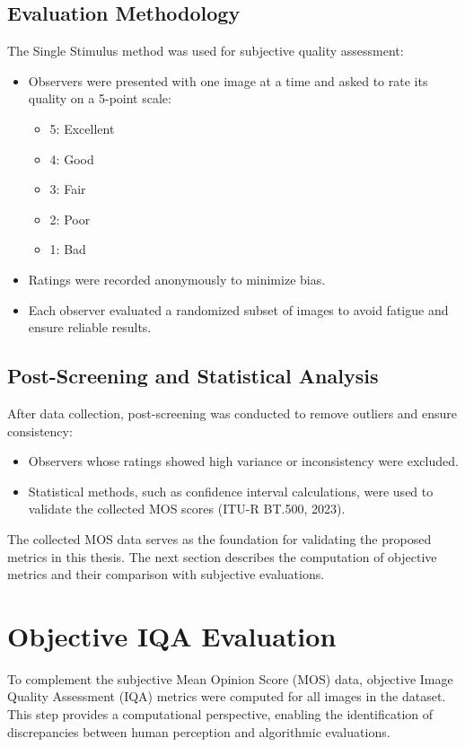 \subsection{Evaluation Methodology}

The Single Stimulus method was used for subjective quality assessment:
\begin{itemize}
    \item Observers were presented with one image at a time and asked to rate its quality on a 5-point scale:
    \begin{itemize}
        \item 5: Excellent
        \item 4: Good
        \item 3: Fair
        \item 2: Poor
        \item 1: Bad
    \end{itemize}
    \item Ratings were recorded anonymously to minimize bias.
    \item Each observer evaluated a randomized subset of images to avoid fatigue and ensure reliable results.
\end{itemize}

\subsection{Post-Screening and Statistical Analysis}

After data collection, post-screening was conducted to remove outliers and ensure consistency:
\begin{itemize}
    \item Observers whose ratings showed high variance or inconsistency were excluded.
    \item Statistical methods, such as confidence interval calculations, were used to validate the collected MOS scores (ITU-R BT.500, 2023).
\end{itemize}

The collected MOS data serves as the foundation for validating the proposed metrics in this thesis. The next section describes the computation of objective metrics and their comparison with subjective evaluations.

\section{Objective IQA Evaluation}

To complement the subjective Mean Opinion Score (MOS) data, objective Image Quality Assessment (IQA) metrics were computed for all images in the dataset. This step provides a computational perspective, enabling the identification of discrepancies between human perception and algorithmic evaluations.

